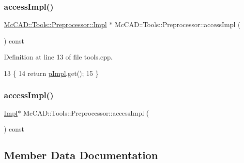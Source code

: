 \subsubsection{\texorpdfstring{access\+Impl()}{accessImpl()}\hspace{0.1cm}{\footnotesize\ttfamily [1/2]}}
{\footnotesize\ttfamily \hyperlink{classMcCAD_1_1Tools_1_1Preprocessor_1_1Impl}{Mc\+C\+A\+D\+::\+Tools\+::\+Preprocessor\+::\+Impl} $\ast$ Mc\+C\+A\+D\+::\+Tools\+::\+Preprocessor\+::access\+Impl (\begin{DoxyParamCaption}{ }\end{DoxyParamCaption}) const}



Definition at line 13 of file tools.\+cpp.


\begin{DoxyCode}
13                                         \{
14   \textcolor{keywordflow}{return} \hyperlink{classMcCAD_1_1Tools_1_1Preprocessor_acd2ccc9134184b465a4ea2de5df90468}{pImpl}.get();
15 \}
\end{DoxyCode}
\mbox{\label{classMcCAD_1_1Tools_1_1Preprocessor_adaa5582f350b8bc3008d3bdf4faa432d}} 
\subsubsection{\texorpdfstring{access\+Impl()}{accessImpl()}\hspace{0.1cm}{\footnotesize\ttfamily [2/2]}}
{\footnotesize\ttfamily \hyperlink{classMcCAD_1_1Tools_1_1Preprocessor_1_1Impl}{Impl}$\ast$ Mc\+C\+A\+D\+::\+Tools\+::\+Preprocessor\+::access\+Impl (\begin{DoxyParamCaption}{ }\end{DoxyParamCaption}) const}



\subsection{Member Data Documentation}
\mbox{\label{classMcCAD_1_1Tools_1_1Preprocessor_acd2ccc9134184b465a4ea2de5df90468}} 
